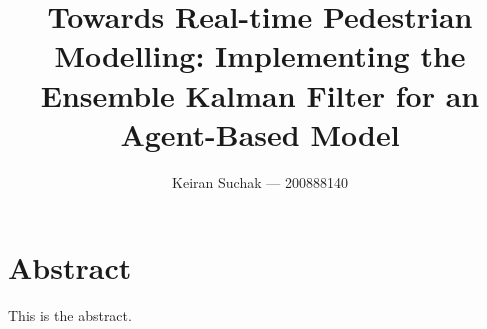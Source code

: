 \documentclass[12pt, twoside, a4paper]{report}
\begin{document}
\title{Towards Real-time Pedestrian Modelling: Implementing the Ensemble Kalman
Filter for an Agent-Based Model}
\author{Keiran Suchak --- 200888140}
\maketitle

\chapter*{\centering Abstract}

This is the abstract.

\tableofcontents
\listoffigures
\listoftables




\end{document}
